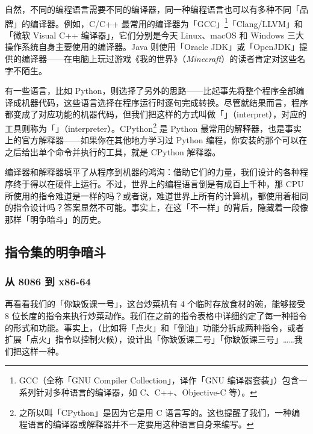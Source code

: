 自然，不同的编程语言需要不同的编译器，同一种编程语言也可以有多种不同「品牌」的编译器。例如，C/C++ 最常用的编译器为「GCC」\footnote{GCC（全称「GNU Compiler Collection」，译作「GNU 编译器套装」）包含一系列针对多种语言的编译器，如 C、C++、Objective-C 等）。}「Clang/LLVM」和「微软 Visual C++ 编译器」，它们分别是今天 Linux、macOS 和 Windows 三大操作系统自身主要使用的编译器。Java 则使用「Oracle JDK」或「OpenJDK」提供的编译器——在电脑上玩过游戏《我的世界》（\textit{Minecraft}）的读者肯定对这些名字不陌生。

有一些语言，比如 Python，则选择了另外的思路——比起事先将整个程序全部编译成机器代码，这些语言选择在程序运行时逐句完成转换。尽管就结果而言，程序都变成了对应功能的机器代码，但我们把这样的方式叫做「」（interpret），对应的工具则称为「」（interpreter）。CPython\footnote{之所以叫「CPython」是因为它是用 C 语言写的。这也提醒了我们，一种编程语言的编译器或解释器并不一定要用这种语言自身来编写。} 是 Python 最常用的解释器，也是事实上的官方解释器——如果你在其他地方学习过 Python 编程，你安装的那个可以在 \MissingVerb{>>>} 之后给出单个命令并执行的工具，就是 CPython 解释器。

编译器和解释器填平了从程序到机器的鸿沟：借助它们的力量，我们设计的各种程序终于得以在硬件上运行。不过，世界上的编程语言倒是有成百上千种，那 CPU 所使用的指令难道是一样的吗？或者说，难道世界上所有的计算机，都使用着相同的指令设计吗？答案显然不可能。事实上，在这「不一样」的背后，隐藏着一段像\hyperref[cha:browsers-and-how-to-choose]{}那样「明争暗斗」的历史。

\subsection{指令集的明争暗斗}

\subsubsection{从 8086 到 x86-64}

再看看我们的「你缺饭课一号」，这台炒菜机有 4 个临时存放食材的碗，能够接受 8 位长度的指令来执行炒菜动作。我们在之前的指令表格中详细约定了每一种指令的形式和功能。事实上，（比如将「点火」和「倒油」功能分拆成两种指令，或者扩展「点火」指令以控制火候），设计出「你缺饭课二号」「你缺饭课三号」……我们把这样一种。

